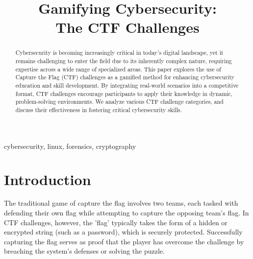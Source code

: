 \documentclass[conference]{IEEEtran}
\begin{document}
\title{Gamifying Cybersecurity:\\The CTF Challenges}

\author{
\and
{}
}

\maketitle

\begin{abstract}
Cybersecurity is becoming increasingly critical in today's digital landscape,
  yet it remains challenging to enter the field due to its inherently complex
  nature, requiring expertise across a wide range of specialized areas. This
  paper explores the use of Capture the Flag (CTF) challenges as a gamified
  method for enhancing cybersecurity education and skill development. By
  integrating real-world scenarios into a competitive format, CTF challenges
  encourage participants to apply their knowledge in dynamic, problem-solving
  environments. We analyze various CTF challenge categories, and discuss their
  effectiveness in fostering critical cybersecurity skills.
\end{abstract}

\begin{IEEEkeywords}
cybersecurity, linux, forensics, cryptography
\end{IEEEkeywords}

\section{Introduction}

The traditional game of capture the flag involves two teams, each tasked with
defending their own flag while attempting to capture the opposing team’s flag.
In CTF challenges, however, the 'flag' typically takes the form of a hidden or
encrypted string (such as a password), which is securely protected.
Successfully capturing the flag serves as proof that the player has overcome
the challenge by breaching the system's defenses or solving the puzzle.
\end{document}
